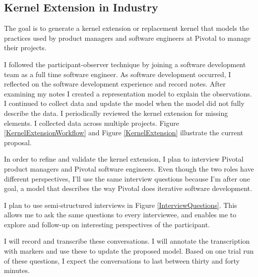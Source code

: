 \documentclass[preprint,12pt,3p]{elsarticle}
\begin{document}
\subsection{Kernel Extension in Industry}
\label{PivotalKernelExtension}

The goal is to generate a kernel extension or replacement kernel that models the practices used by product managers and software engineers at Pivotal to manage their projects.

I followed the participant-observer technique by joining a software development team as a full time software engineer. As software development occurred, I reflected on the software development experience and record notes. After examining my notes I created a representation model to explain the observations. I continued to collect data and update the model when the model did not fully describe the data. I periodically reviewed the kernel extension for missing elements. I collected data across multiple projects. Figure \ref{KernelExtensionWorkflow} and Figure \ref{KernelExtension} illustrate the current proposal.

In order to refine and validate the kernel extension, I plan to interview Pivotal product managers and Pivotal software engineers. Even though the two roles have different perspectives, I'll use the same interview questions because I'm after one goal, a model that describes the way Pivotal does iterative software development.

I plan to use semi-structured interviews in Figure \ref{InterviewQuestions}. This allows me to ask the same questions to every interviewee, and enables me to explore and follow-up on interesting perspectives of the participant.

I will record and transcribe these conversations. I will annotate the transcription with markers and use these to update the proposed model. Based on one trial run of these questions, I expect the conversations to last between thirty and forty minutes. 
\end{document}
